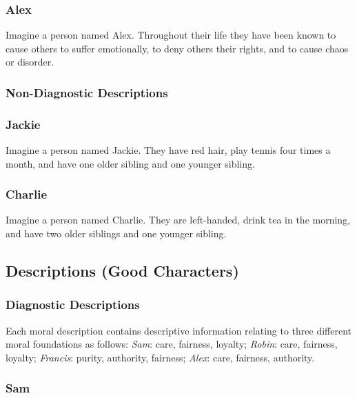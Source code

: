 \documentclass[
  man,floatsintext]{apa6}
\begin{document}
\subsubsection{Alex}\label{alex}

Imagine a person named Alex.
Throughout their life they have been known to cause others to suffer emotionally, to deny others their rights, and to cause chaos or disorder.

\subsubsection{Non-Diagnostic Descriptions}\label{non-diagnostic-descriptions}

\subsubsection{Jackie}\label{jackie}

Imagine a person named Jackie.
They have red hair, play tennis four times a month, and have one older sibling and one younger sibling.

\subsubsection{Charlie}\label{charlie}

Imagine a person named Charlie.
They are left-handed, drink tea in the morning, and have two older siblings and one younger sibling.

\newpage

\subsection{Descriptions (Good Characters)}\label{descriptions-good-characters}

\subsubsection{Diagnostic Descriptions}\label{diagnostic-descriptions-1}

Each moral description contains descriptive information relating to three different moral foundations as follows: \emph{Sam}: care, fairness, loyalty; \emph{Robin}: care, fairness, loyalty; \emph{Francis}: purity, authority, fairness; \emph{Alex}: care, fairness, authority.

\subsubsection{Sam}\label{sam-1}
\end{document}
